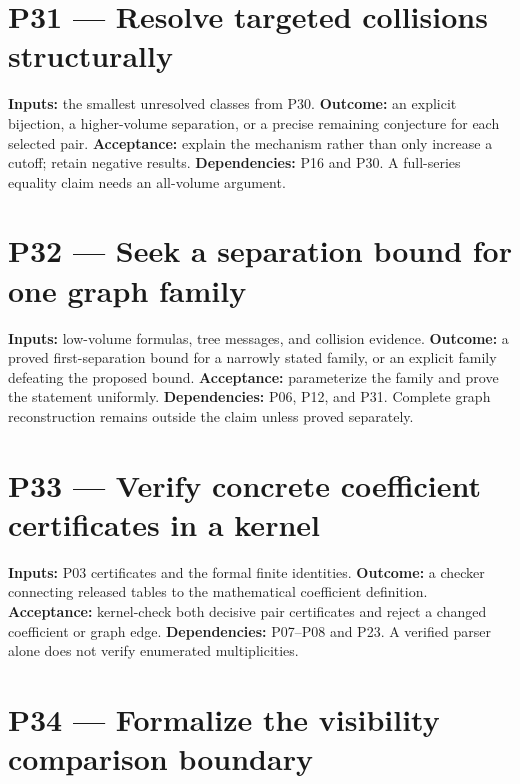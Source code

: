 \documentclass[
  11pt,
  a4paper,
]{report}
\begin{document}
\hypertarget{p31-resolve-targeted-collisions-structurally}{%
\section{P31 --- Resolve targeted collisions
structurally}\label{p31-resolve-targeted-collisions-structurally}}

\textbf{Inputs:} the smallest unresolved classes from P30.
\textbf{Outcome:} an explicit bijection, a higher-volume separation, or
a precise remaining conjecture for each selected pair.
\textbf{Acceptance:} explain the mechanism rather than only increase a
cutoff; retain negative results. \textbf{Dependencies:} P16 and P30. A
full-series equality claim needs an all-volume argument.

\hypertarget{p32-seek-a-separation-bound-for-one-graph-family}{%
\section{P32 --- Seek a separation bound for one graph
family}\label{p32-seek-a-separation-bound-for-one-graph-family}}

\textbf{Inputs:} low-volume formulas, tree messages, and collision
evidence. \textbf{Outcome:} a proved first-separation bound for a
narrowly stated family, or an explicit family defeating the proposed
bound. \textbf{Acceptance:} parameterize the family and prove the
statement uniformly. \textbf{Dependencies:} P06, P12, and P31. Complete
graph reconstruction remains outside the claim unless proved separately.

\hypertarget{p33-verify-concrete-coefficient-certificates-in-a-kernel}{%
\section{P33 --- Verify concrete coefficient certificates in a
kernel}\label{p33-verify-concrete-coefficient-certificates-in-a-kernel}}

\textbf{Inputs:} P03 certificates and the formal finite identities.
\textbf{Outcome:} a checker connecting released tables to the
mathematical coefficient definition. \textbf{Acceptance:} kernel-check
both decisive pair certificates and reject a changed coefficient or
graph edge. \textbf{Dependencies:} P07--P08 and P23. A verified parser
alone does not verify enumerated multiplicities.

\hypertarget{p34-formalize-the-visibility-comparison-boundary}{%
\section{P34 --- Formalize the visibility comparison
boundary}\label{p34-formalize-the-visibility-comparison-boundary}}
\end{document}
